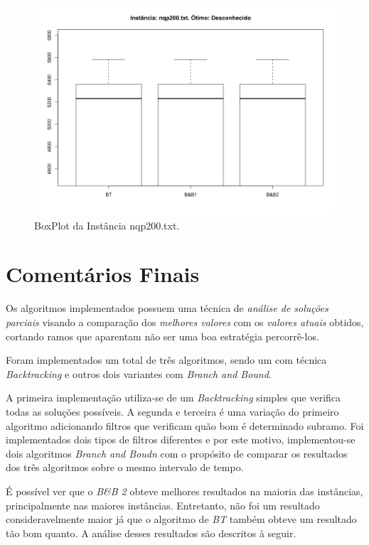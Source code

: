 \documentclass[12pt]{article}
\begin{document}
	\begin{figure}[H]
		\centering
		\includegraphics[width=0.9\linewidth]{img/200-2}
		\caption{BoxPlot da Instância nqp200.txt.}
		\label{fig:200-2}
	\end{figure}


\section{Comentários Finais}\label{sec:figs}
	Os algoritmos implementados possuem uma técnica de \textit{análise de soluções parciais} visando a comparação dos \textit{melhores valores} com os \textit{valores atuais} obtidos, cortando ramos que aparentam não ser uma boa estratégia percorrê-los.

	Foram implementados um total de três algoritmos, sendo um com técnica \textit{Backtracking} e outros dois variantes com \textit{Branch and Bound}.

	A primeira implementação utiliza-se de um \textit{Backtracking} simples que verifica todas as soluções possíveis.
	A segunda e terceira é uma variação do primeiro algoritmo adicionando filtros que verificam quão bom é determinado subramo. Foi implementados dois tipos de filtros diferentes e por este motivo, implementou-se dois algoritmos \textit{Branch and Boudn} com o propósito de comparar os resultados dos três algoritmos sobre o mesmo intervalo de tempo.

	É possível ver que o \textit{B\&B 2} obteve melhores resultados na maioria das instâncias, principalmente nas maiores instâncias. Entretanto, não foi um resultado consideravelmente maior já que o algoritmo de \textit{BT} também obteve um resultado tão bom quanto. A análise desses resultados são descritos à seguir.
\end{document}
